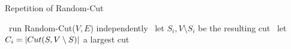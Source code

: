\begin{algorithm}
    \caption{Repetition of Random-Cut}\label{alg:randomcut_rep}
    \begin{algorithmic}%
            \State~run Random-Cut($V,E$) independently
            \State~let $S_i, V \setminus S_i$ be the resulting cut
            \State~let $C_i = \vert Cut(S, V \setminus S) \vert$
        \EndFor
        \State \Return a largest cut
    \end{algorithmic}
\end{algorithm}